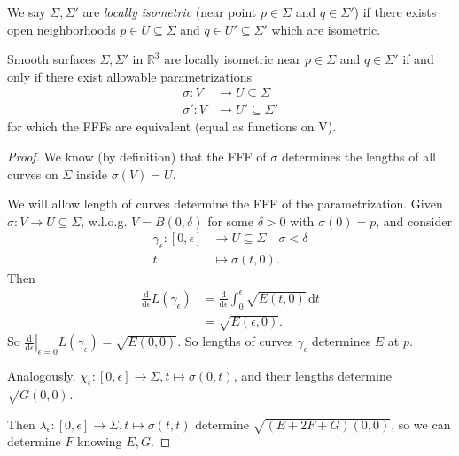 We say \(\Sigma, \Sigma'\) are \textit{locally isometric} (near point \(p \in \Sigma\) and \(q \in \Sigma'\)) if there exists open neighborhoods \(p \in U \subseteq \Sigma\) and \(q \in U' \subseteq \Sigma'\) which are isometric.
\begin{lemma}
    Smooth surfaces \(\Sigma, \Sigma'\) in \(\mathbb{R}^3\) are locally isometric near \(p \in \Sigma\) and \(q \in \Sigma'\) if and only if there exist allowable parametrizations
    \begin{align*}
        \sigma: V &\to U \subseteq \Sigma\\
        \sigma': V &\to U' \subseteq \Sigma'
    \end{align*}
    for which the FFFs are equivalent (equal as functions on V).
\end{lemma}
\begin{proof}
    We know (by definition) that the FFF of \(\sigma\) determines the lengths of all curves on \(\Sigma\) inside \(\sigma(V) = U\).

    We will allow length  of curves determine the FFF of the parametrization. Given \(\sigma: V \to U \subseteq \Sigma\), w.l.o.g. \(V = B(0,\delta)\) for some \(\delta > 0\) with \(\sigma(0) = p\), and consider
    \begin{align*}
        \gamma_\epsilon: [0, \epsilon] &\to U \subseteq \Sigma \quad \sigma<\delta\\
        t &\mapsto \sigma(t, 0).
    \end{align*}
    Then
    \begin{align*}
        \frac{\mathrm{d}}{\mathrm{d}\epsilon}L(\gamma_\epsilon) &= \frac{\mathrm{d}}{\mathrm{d}\epsilon} \int_{0}^{\epsilon} \sqrt{E(t,0)}  \,\mathrm{d}t\\
        &= \sqrt{E(\epsilon,0)}.
    \end{align*}
    So \(\left.\frac{\mathrm{d}}{\mathrm{d}\epsilon}\right|_{\epsilon=0}L(\gamma_\epsilon)= \sqrt{E(0,0)}\). So lengths of curves \(\gamma_\epsilon\) determines \(E\) at \(p\).

    Analogously, \(\chi_\epsilon: [0,\epsilon] \to \Sigma, t \mapsto \sigma(0,t)\), and their lengths determine \(\sqrt{G(0,0)}\).

    Then \(\lambda_\epsilon: [0,\epsilon] \to \Sigma, t \mapsto \sigma(t,t)\) determine \(\sqrt{(E + 2F + G)(0,0)}\), so we can determine \(F\) knowing \(E, G\).
\end{proof}
